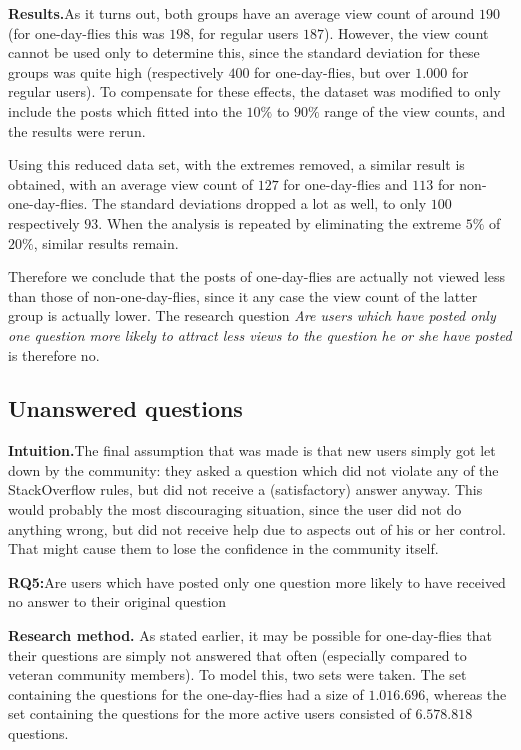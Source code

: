 \documentclass[conference]{IEEEtran}
\begin{document}
\textbf{Results.}As it turns out, both groups have an average view count of around $190$ (for
one-day-flies this was $198$, for regular users $187$). However, the view count
cannot be used only to determine this, since the standard deviation for these
groups was quite high (respectively $400$ for one-day-flies, but over $1.000$
for regular users). To compensate for these effects, the dataset was modified
to only include the posts which fitted into the $10\%$ to $90\%$ range of the
view counts, and the results were rerun.

Using this reduced data set, with the extremes removed, a similar result is
obtained, with an average view count of $127$ for one-day-flies and $113$ for
non-one-day-flies. The standard deviations dropped a lot as well, to only $100$
respectively $93$. When the analysis is repeated by eliminating the extreme
$5\%$ of $20\%$, similar results remain.

Therefore we conclude that the posts of one-day-flies are actually not viewed
less than those of non-one-day-flies, since it any case the view count of the
latter group is actually lower. The research question \textit{Are users which
have posted only one question more likely to attract less views to the question
he or she have posted} is therefore no.


\subsection{Unanswered questions}

\textbf{Intuition.}The final assumption that was made is that new users simply got let down by the
community: they asked a question which did not violate any of the StackOverflow
rules, but did not receive a (satisfactory) answer anyway. This would probably
the most discouraging situation, since the user did not do anything wrong, but
did not receive help due to aspects out of his or her control. That might cause
them to lose the confidence in the community itself. 
 
\textbf{RQ5:}Are users which have posted only one question more
likely to have received no answer to their original question
 
\textbf{Research method.} As stated earlier, it may be possible for one-day-flies that their questions
are simply not answered that often (especially compared to veteran community
members). To model this, two sets were taken. The set containing the questions
for the one-day-flies had a size of $1.016.696$, whereas the set containing the
questions for the more active users consisted of $6.578.818$ questions.
\end{document}
